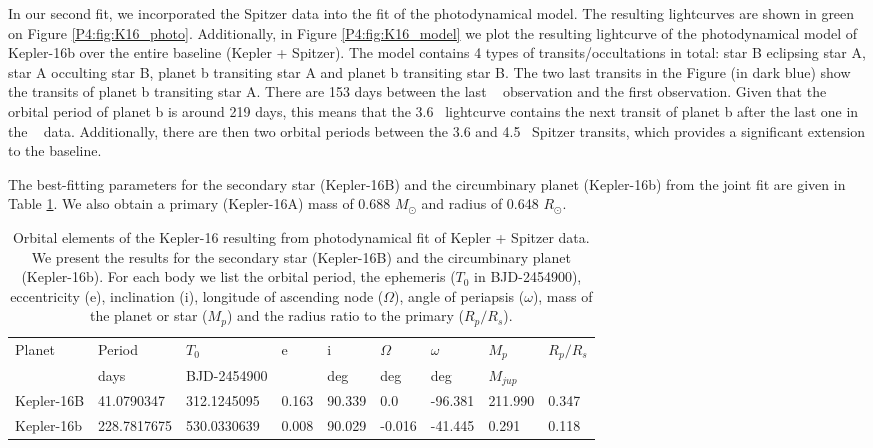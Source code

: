 In our second fit, we incorporated the Spitzer data into the fit of the photodynamical model. The resulting lightcurves are shown in green on Figure \ref{P4:fig:K16_photo}. Additionally, in Figure \ref{P4:fig:K16_model} we plot the resulting lightcurve of the photodynamical model of Kepler-16b over the entire baseline (Kepler + Spitzer). The model contains 4 types of transits/occultations in total: star B eclipsing star A, star A occulting star B, planet b transiting star A and planet b transiting star B. The two last transits in the Figure (in dark blue) show the \spitzer transits of planet b transiting star A. There are 153 days between the last \Kepler~ observation and the first \spitzer observation. Given that the orbital period of planet b is around 219 days, this means that the 3.6\um~ \spitzer lightcurve contains the next transit of planet b after the last one in the \Kepler~ data. Additionally, there are then two orbital periods between the 3.6 and 4.5\um~ Spitzer transits, which provides a significant extension to the baseline.

The best-fitting parameters for the secondary star (Kepler-16B) and the circumbinary planet (Kepler-16b) from the joint fit are given in Table \ref{P4:tab:photodynamicresults}. We also obtain a primary (Kepler-16A) mass of 0.688 $M_\odot$ and radius of 0.648 $R_\odot$.

\begin{table}  \setlength{\tabcolsep}{2pt}

    \centering

    \caption{Orbital elements of the Kepler-16 resulting from photodynamical fit of Kepler + Spitzer data. We present the results for the secondary star (Kepler-16B) and the circumbinary planet (Kepler-16b). For each body we list the orbital period, the ephemeris ($T_0$ in BJD-2454900), eccentricity (e), inclination (i), longitude of ascending node ($\Omega$), angle of periapsis ($\omega$), mass of the planet or star ($M_p$) and the radius ratio to the primary ($R_p/R_s$).}
    \label{P4:tab:photodynamicresults}
    \begin{tabular}{lllllllll}
\hline\hline
Planet & Period  & $T_0$ & e & i & $\Omega$ & $\omega$ & $M_p$ & $R_p/R_s$    \\
       & days & BJD-2454900 & & deg & deg & deg & $M_{jup}$ & \\
\hline
Kepler-16B	& 41.0790347 & 312.1245095 & 0.163 & 90.339	& 0.0	& -96.381	& 211.990	& 0.347  \\
Kepler-16b & 228.7817675 & 530.0330639 & 0.008 & 90.029 & -0.016 & -41.445 & 0.291 & 0.118  \\
\hline
    \end{tabular}

\end{table}



